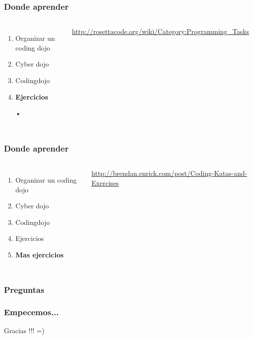 \documentclass{beamer}
\begin{document}
\begin{frame}
\frametitle{Donde aprender}
\begin{columns}[c] %
\begin{enumerate}
\item Organizar un coding dojo
\item Cyber dojo
\item Codingdojo
\item \textbf{Ejercicios}
\item[•]
\end{enumerate}

{\color{blue}\url{http://rosettacode.org/wiki/Category:Programming_Tasks}}
\end{columns}
\end{frame}
\begin{frame}
\frametitle{Donde aprender}
\begin{columns}[c] %
\begin{enumerate}
\item Organizar un coding dojo
\item Cyber dojo
\item Codingdojo
\item Ejercicios
\item \textbf{Mas ejercicios}
\end{enumerate}

{\color{blue}\url{http://brendan.enrick.com/post/Coding-Katas-and-Exercises}}
\end{columns}
\end{frame}
\begin{frame}
\frametitle{Preguntas}
\end{frame}
\begin{frame}
\frametitle{Empecemos...}
\begin{figure}
\end{figure}
\end{frame}
\begin{frame}
\Huge{\centerline{Gracias !!! =)}}
\end{frame}

\end{document}
